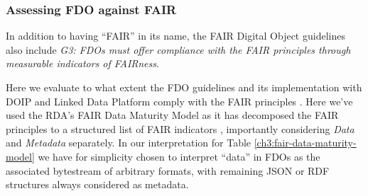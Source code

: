 \subsubsection{Assessing FDO against FAIR}\label{ch3:fair-compare}

In addition to having ``FAIR'' in its name, the FAIR Digital Object guidelines \cite{fdo-RequirementSpec} also include \emph{G3: FDOs must offer compliance with the FAIR principles through measurable indicators of FAIRness}.

Here we evaluate to what extent the FDO guidelines and its implementation with DOIP and Linked Data Platform \cite{bonino2021} comply with the FAIR principles \cite{Wilkinson 2016}. Here we've used the RDA's FAIR Data Maturity Model \cite{groupFAIRDataMaturity2020} as it has decomposed the FAIR principles to a structured list of FAIR indicators \cite{bahimFAIRDataMaturity2020a}, importantly considering \emph{Data} and \emph{Metadata} separately. In our interpretation for Table \vref{ch3:fair-data-maturity-model} we have for simplicity chosen to interpret ``data'' in FDOs as the associated bytestream of arbitrary formats, with remaining JSON or RDF structures always considered as metadata.

